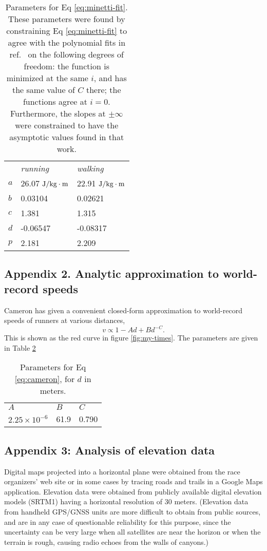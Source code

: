 \documentclass[10pt,letterpaper]{article}
\begin{document}
\begin{table}[h]
\caption{Parameters for Eq \eqref{eq:minetti-fit}. These parameters were found by constraining
Eq \ref{eq:minetti-fit} to agree with the polynomial fits in ref.~\cite{minetti} on the following
degrees of freedom: the function is minimized at the same $i$, and has the same value of $C$ there;
the functions agree at $i=0$. Furthermore, the slopes at $\pm\infty$ were constrained to have the asymptotic values
found in that work.}
\begin{tabular}{lll}
   & \emph{running} & \emph{walking} \\
$a$  & 26.07 $\textup{J}/\textup{kg}\cdot\textup{m}$ & 22.91 $\textup{J}/\textup{kg}\cdot\textup{m}$ \\
$b$  & 0.03104 & 0.02621 \\
$c$ & 1.381 & 1.315 \\
$d$ & -0.06547 & -0.08317 \\
$p$ & 2.181 & 2.209
\end{tabular}
\label{table:minetti-params}
\end{table}

\subsection*{Appendix 2. Analytic approximation to world-record speeds}

Cameron\cite{cameron} has given a
convenient closed-form approximation to world-record speeds of runners at various distances,
\begin{equation}\label{eq:cameron}
  v\propto 1-Ad+Bd^{-C}.
\end{equation}
This is shown as the red curve in figure \ref{fig:my-times}. The parameters are given in Table \ref{table:cameron-parameters}

\begin{table}[h]
\caption{Parameters for Eq \eqref{eq:cameron}, for $d$ in meters.}
\begin{tabular}{lll}
$A$ & $B$ & $C$ \\
$2.25\times10^{-6}$ & 61.9 & 0.790
\end{tabular}
\label{table:cameron-parameters}
\end{table}



\subsection*{Appendix 3: Analysis of elevation data}
Digital maps projected into a horizontal plane were obtained from the race organizers' web site
or in some cases by tracing roads and trails in a Google Maps application. Elevation data
were obtained from publicly available digital elevation models (SRTM1) having a horizontal
resolution of 30 meters. (Elevation data from handheld GPS/GNSS units are more difficult to
obtain from public sources, and are in any case of questionable reliability
for this purpose, since the uncertainty can be very large when all satellites are near the
horizon or when the terrain is rough, causing radio echoes from the walls of canyons.)
\end{document}
